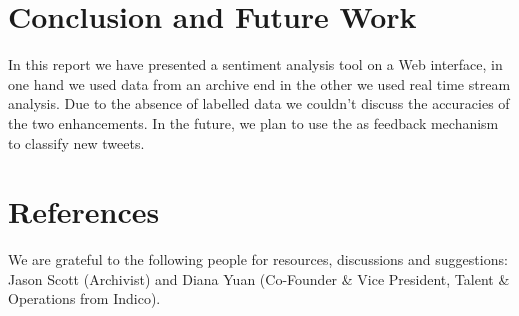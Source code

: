 \documentclass{acmtog} %
\begin{document}
\section{Conclusion and Future Work}
\label{sec:conclusion}

In this report we have presented a sentiment analysis tool on a Web interface, in one hand we used data from an archive end in the other we used real time stream analysis. Due to the absence of labelled data we couldn’t discuss the accuracies of the two enhancements. In the future, we plan to use the as feedback mechanism to classify new tweets.

\section{References}

\begin{acks}
We are grateful to the following people for resources, discussions and suggestions: Jason Scott (Archivist) and Diana Yuan (Co-Founder & Vice President, Talent & Operations from Indico).
\end{acks}





\end{document}
